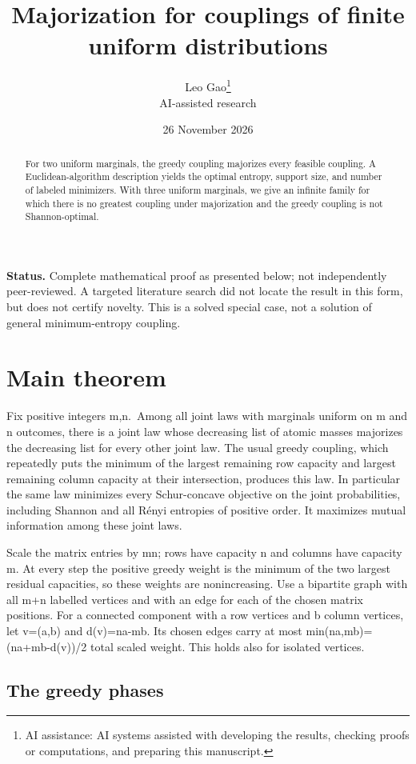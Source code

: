 \documentclass[11pt]{article}
\title{\textcolor{ink}{Majorization for couplings of finite uniform distributions}}
\author{Leo Gao\thanks{AI assistance: AI systems assisted with developing the results, checking proofs or computations, and preparing this manuscript.}\\[3pt]\small\textsf{AI-assisted research}}
\date{26 November 2026}
\begin{document}
\maketitle
\begin{abstract}
For two uniform marginals, the greedy coupling majorizes every feasible coupling. A Euclidean-algorithm description yields the optimal entropy, support size, and number of labeled minimizers. With three uniform marginals, we give an infinite family for which there is no greatest coupling under majorization and the greedy coupling is not Shannon-optimal.
\end{abstract}
\textbf{Status.} Complete mathematical proof as presented below; not independently peer-reviewed. A targeted literature search did not locate the result in this form, but does not certify novelty. This is a solved special case, not a solution of general minimum-entropy coupling.

\section{Main theorem}\label{main-theorem}

Fix positive integers m,n.~Among all joint laws with marginals uniform on m and n outcomes, there is a joint law whose decreasing list of atomic masses majorizes the decreasing list for every other joint law. The usual greedy coupling, which repeatedly puts the minimum of the largest remaining row capacity and largest remaining column capacity at their intersection, produces this law. In particular the same law minimizes every Schur-concave objective on the joint probabilities, including Shannon and all Rényi entropies of positive order. It maximizes mutual information among these joint laws.

Scale the matrix entries by mn; rows have capacity n and columns have capacity m. At every step the positive greedy weight is the minimum of the two largest residual capacities, so these weights are nonincreasing. Use a bipartite graph with all m+n labelled vertices and with an edge for each of the chosen matrix positions. For a connected component with a row vertices and b column vertices, let v=(a,b) and d(v)=na-mb. Its chosen edges carry at most min(na,mb)=(na+mb-\textbar d(v)\textbar)/2 total scaled weight. This holds also for isolated vertices.

\subsection{The greedy phases}\label{the-greedy-phases}
\end{document}

